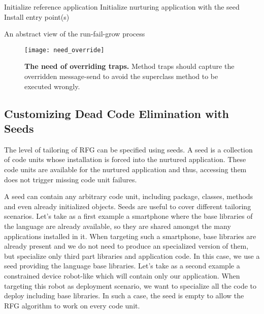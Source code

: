 \begin{algorithm}[ht]
 Initialize reference application\;
 Initialize nurturing application with the seed\;
 Install entry point(s)\;
 \caption{\small An abstract view of the run-fail-grow process \label{alg:tailoring_process}}
\end{algorithm}


\begin{figure}[ht]
\begin{center}
\texttt{[image: need\_override]}
\caption{\small\textbf{The need of overriding traps.} \small Method traps should capture the overridden  message-send to avoid the superclass method to be executed wrongly.\label{fig:need_override}}
\end{center}
\end{figure}



\subsection{Customizing Dead Code Elimination with Seeds}\label{sec:seeds}

The level of tailoring of RFG can be specified using seeds. A seed is a collection of code units whose installation is forced into the nurtured application. These code units are available for the nurtured application and thus, accessing them does not trigger missing code unit failures.

A seed can contain any arbitrary code unit, including package, classes, methods and even already initialized objects. Seeds are useful to cover different tailoring scenarios. Let's take as a first example a smartphone where the base libraries of the language are already available, so they are shared amongst the many applications installed in it. When targeting such a smartphone, base libraries are already present and we do not need to produce an specialized version of them, but specialize only third part libraries and application code. In this case, we use a seed providing the language base libraries. Let's take as a second example a constrained device robot-like which will contain only our application. When targeting this robot as deployment scenario, we want to specialize all the code to deploy including base libraries. In such a case, the seed is empty to allow the RFG algorithm to work on every code unit.

